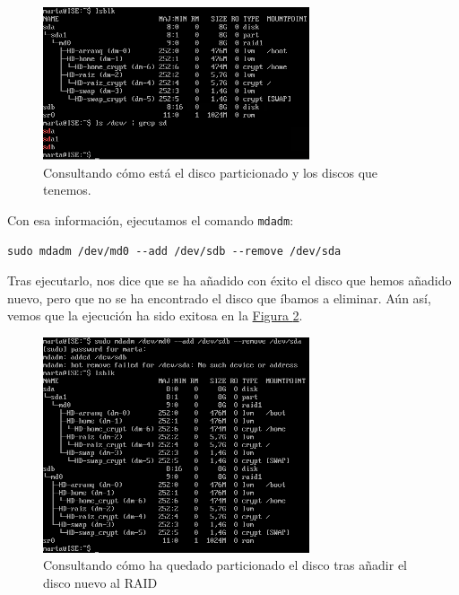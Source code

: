 \documentclass[10pt,a4paper,spanish]{article}
\numberwithin{equation}{section} %
\numberwithin{figure}{section} %
\numberwithin{table}{section} %
\begin{document}
\begin{enumerate}[1.]
    \begin{figure}[!h]
        \centering
        \includegraphics[width=0.7\textwidth]{5}
        \caption{Consultando cómo está el disco particionado y los discos que tenemos.}
        \label{lsblk}
    \end{figure}

    Con esa información, ejecutamos el comando \texttt{mdadm}:

\begin{verbatim}
sudo mdadm /dev/md0 --add /dev/sdb --remove /dev/sda    
\end{verbatim}

    Tras ejecutarlo, nos dice que se ha añadido con éxito el disco que hemos añadido nuevo, pero que no se ha encontrado el disco que íbamos a eliminar. Aún así, vemos que la ejecución ha sido exitosa en la \hyperref[finaloutput]{Figura \ref*{finaloutput}}.

    \begin{figure}[!h]
        \centering
        \includegraphics[width=0.7\textwidth]{6}
        \caption{Consultando cómo ha quedado particionado el disco tras añadir el disco nuevo al RAID}
        \label{finaloutput}
    \end{figure}
\end{enumerate}
\end{document}
